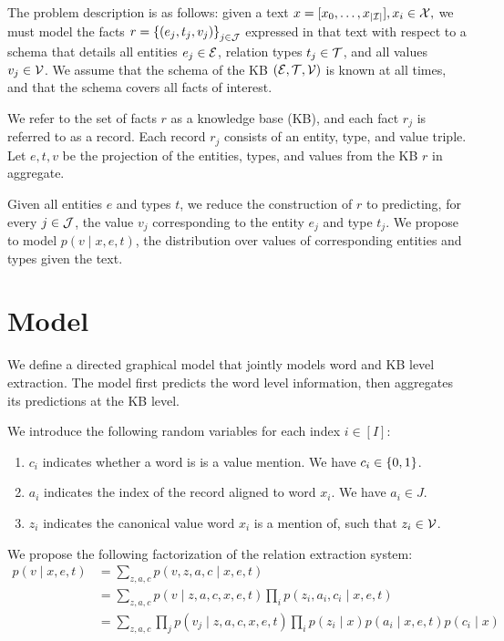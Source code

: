 \documentclass[12pt]{article}
\begin{document}
The problem description is as follows:
given a text $x = [x_0, \ldots, x_{|\mathcal{I}|}],x_i \in \mathcal{X},$ we must model the facts
$r = \left\{(e_j, t_j, v_j)\right\}_{j \in \mathcal{J}}$ expressed in that text
with respect to a schema that details all entities $e_j \in \mathcal{E}$,
relation types $t_j \in \mathcal{T}$, and all values $v_j \in \mathcal{V}$.
We assume that the schema of the KB $(\mathcal{E}, \mathcal{T}, \mathcal{V})$ is known at all times,
and that the schema covers all facts of interest.

We refer to the set of facts $r$ as a knowledge base (KB),
and each fact $r_j$ is referred to as a record.
Each record $r_j$ consists of an entity, type, and value triple. 
Let $e,t,v$ be the projection of the entities, types, and values
from the KB $r$ in aggregate.

Given all entities $e$ and types $t$,
we reduce the construction of $r$ to predicting, for every $j\in \mathcal{J}$,
the value $v_j$ corresponding to the entity $e_j$ and type $t_j$.
We propose to model $p(v \mid x, e, t)$,
the distribution over values of corresponding entities and types given the text.

\section{Model}
We define a directed graphical model that jointly models 
word and KB level extraction. 
The model first predicts the word level information,
then aggregates its predictions at the KB level.

We introduce the following random variables for each index $i \in [I]$:
\begin{enumerate}
\item $c_i$ indicates whether a word is is a value mention.
    We have $c_i \in \left\{0,1\right\}$.
\item $a_i$ indicates the index of the record aligned to word $x_i$.
    We have $a_i \in J$.
\item $z_i$ indicates the canonical value word $x_i$ is a mention of,
    such that $z_i \in \mathcal{V}$.
\end{enumerate}

We propose the following factorization of the relation extraction system:
\begin{equation}
\label{eqn:prob}
\begin{aligned}
p(v \mid x,e,t) &= \sum_{z,a,c} p(v,z,a,c\mid x,e,t)\\
&= \sum_{z,a,c} p(v\mid z,a,c,x,e,t) \prod_i p(z_i, a_i, c_i\mid x,e,t)\\
&= \sum_{z,a,c} \prod_j p(v_j\mid z,a,c,x,e,t) \prod_i p(z_i\mid x)p(a_i\mid x,e,t)p(c_i\mid x)\\
\end{aligned}
\end{equation}
\end{document}
